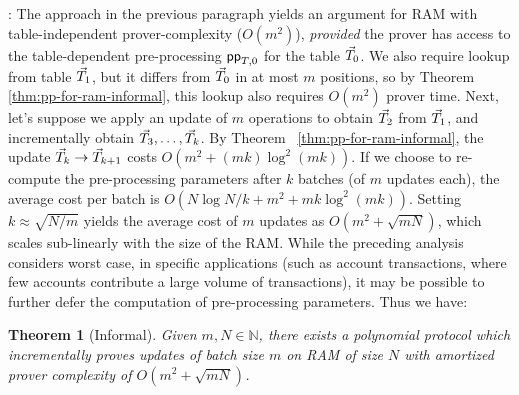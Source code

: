 \documentclass[sigconf]{acmart}
\newtheorem{theorem}{Theorem}[section]
\begin{document}
: The approach in the previous paragraph yields an argument for RAM with
table-independent prover-complexity ($O(m^2)$), {\em provided} the prover has access to the table-dependent pre-processing
$\mathsf{pp}_{T,0}$ for the table $\vec{T}_0$. We also require lookup from table $\vec{T}_1$, but it differs from $\vec{T}_0$ in at most $m$
positions, so by Theorem \ref{thm:pp-for-ram-informal}, this lookup also requires $O(m^2)$ prover time. Next, let's suppose we apply an
update of $m$ operations to obtain $\vec{T}_2$ from $\vec{T}_1$, and incrementally obtain $\vec{T}_3,\ldots,\vec{T}_k$. By Theorem ~\ref{thm:pp-for-ram-informal},
the update $\vec{T}_k\rightarrow \vec{T}_{k+1}$ costs $O(m^2 + (mk)\log^2(mk))$. If we choose to re-compute the pre-processing parameters after $k$
batches (of $m$ updates each), the average cost per batch is $O(N\log N/k + m^2 + mk\log^2(mk))$. Setting $k\approx \sqrt{N/m}$ yields the
average cost of $m$ updates as $O(m^2+\sqrt{mN})$, which scales sub-linearly with the size of the RAM. While the preceding analysis considers
worst case, in specific applications (such as account transactions, where few accounts contribute a large volume of transactions), it may be
possible to further defer the computation of pre-processing parameters. Thus we have:

\begin{theorem}[Informal]\label{thm:inc-ver-ram-informal}
	Given $m,N\in \mathbb{N}$, there exists a polynomial protocol which incrementally proves updates of batch size $m$ on RAM of size $N$
	with amortized prover complexity of $O(m^2 + \sqrt{mN})$.
\end{theorem}
\end{document}
